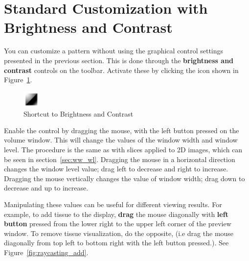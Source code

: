 \section{Standard Customization with Brightness and Contrast}

You can customize a pattern without using the graphical control settings presented in the previous section. This is done through the \textbf{brightness and contrast} controls on the toolbar. Activate these by clicking the icon shown in Figure~\ref{fig:tool_contrast_original_vol}.

\begin{figure}[!htb]
\centering
\includegraphics[scale=0.6]{../user_guide_figures/icons/tool_contrast_original.png}
\caption{Shortcut to Brightness and Contrast}
\label{fig:tool_contrast_original_vol}
\end{figure}

Enable the control by dragging the mouse, with the left button pressed on the volume window. This will change the values of the window width and window level. The procedure is the same as with slices applied to 2D images, which can be seen in section~\ref{sec:ww_wl}. Dragging the mouse in a horizontal direction changes the window level value; drag left to decrease and right to increase. Dragging the mouse vertically changes the value of window width; drag down to decrease and up to increase.

Manipulating these values can be useful for different viewing results. For example, to add tissue to the display, \textbf{drag} the mouse diagonally with \textbf{left button} pressed from the lower right to the upper left corner of the preview window. To remove tissue visualization, do the opposite, (i.e drag the mouse diagonally from top left to bottom right with the left button pressed.). See Figure~\ref{fig:raycasting_add}.


